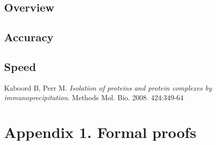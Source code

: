 \documentclass[12pt,twoside]{article}
\begin{document}
\subsection{Overview}

\subsection{Accuracy}

\subsection{Speed}

\begin{thebibliography}{9}

  Kaboord B, Perr M.
  \emph{Isolation of proteins and protein complexes by immunoprecipitation}.
  Methods Mol. Bio. 2008. 424:349-64

\end{thebibliography}





\section{Appendix 1. Formal proofs}
\end{document}
